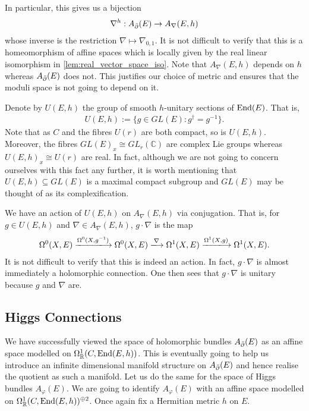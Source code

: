 \documentclass[12pt]{ociamthesis}  %
\begin{document}
In particular, this gives us a bijection
\begin{align}\label{eq:chern_correspondence}
  \nabla^h : A_{\bar{\partial}} (E) \to A_\nabla(E,h)
\end{align}
whose inverse is the restriction
$\nabla \mapsto \nabla_{0,1}$. It is not difficult to verify that this
is a homeomorphism of affine spaces which is locally given by
the real linear isomorphism in \ref{lem:real_vector_space_iso}.
Note that $A_\nabla(E,h)$ depends on $h$ whereas $A_{{\bar{\partial}}}(E)$ does
not. This justifies our choice of metric and ensures that the
moduli space is not going to depend on it.

Denote by $U(E,h)$ the group of smooth $h$-unitary sections of $\operatorname{End}(E)$.
That is,
\begin{align*}
  U(E,h) := \{g \in GL(E) : g^\dagger = g^{-1}\}.
\end{align*}
Note that as $C$ and the fibres $U(r)$ are both compact,
so is $U(E,h)$. Moreover, the fibres $GL(E)_x \cong GL_r(\mathbb C)$
are complex Lie groups whereas $U(E,h)_x\cong U(r)$ are real.
In fact, although we are not going to concern ourselves with this
fact any further, it is worth mentioning that $U(E,h)\subseteq GL(E)$
is a maximal compact subgroup and $GL(E)$ may be thought of as its
complexification.

We have an action of $U(E,h)$ on $A_\nabla(E,h)$ via conjugation. That is,
for $g\in U(E,h)$ and $\nabla\in A_\nabla(E,h)$, $g\cdot\nabla$ is the map
\begin{align*}
  \Omega^0(X,E) \xlongrightarrow{\Omega^0(X,{g}^{-1})}
  \Omega^0(X,E) \xlongrightarrow{\nabla}
  \Omega^1(X,E) \xlongrightarrow{\Omega^1(X,g)}
  \Omega^1(X,E).
\end{align*}
It is not difficult to verify that this is indeed an action.
In fact, $g\cdot\nabla$ is almost immediately a holomorphic connection.
One then sees that $g\cdot\nabla$ is unitary because
$g$ and $\nabla$ are.

\subsection{Higgs Connections}

We have successfully viewed the space of holomorphic bundles
$A_{\bar{\partial}} (E)$ as an affine space modelled on
$\Omega^1_{\mathbb{R}}(C,\operatorname{End}(E,h))$. This is eventually going
to help us introduce an infinite dimensional manifold structure on
$A_{\bar{\partial}} (E)$ and hence realise the quotient as such a manifold.
Let us do the same for the space of Higgs
bundles $A_\varphi(E)$. We are going to identify $A_\varphi(E)$ with an affine
space modelled on $\Omega^1_{\mathbb{R}}(C,\operatorname{End}(E,h))^{\oplus 2}$.
Once again fix a Hermitian metric $h$ on $E$.
\end{document}
